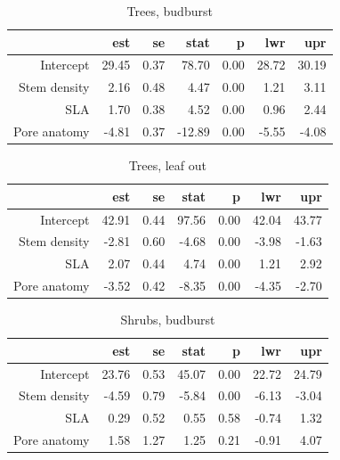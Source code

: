\documentclass[11pt]{article}
\begin{document}
\begin{table}[ht]
\centering
\caption{Trees, budburst} 
\begin{tabular}{rrrrrrr}
  \hline
 & est & se & stat & p & lwr & upr \\ 
  \hline
Intercept & 29.45 & 0.37 & 78.70 & 0.00 & 28.72 & 30.19 \\ 
  Stem density & 2.16 & 0.48 & 4.47 & 0.00 & 1.21 & 3.11 \\ 
  SLA & 1.70 & 0.38 & 4.52 & 0.00 & 0.96 & 2.44 \\ 
  Pore anatomy & -4.81 & 0.37 & -12.89 & 0.00 & -5.55 & -4.08 \\ 
   \hline
\end{tabular}
\end{table}%
\begin{table}[ht]
\centering
\caption{Trees, leaf out} 
\begin{tabular}{rrrrrrr}
  \hline
 & est & se & stat & p & lwr & upr \\ 
  \hline
Intercept & 42.91 & 0.44 & 97.56 & 0.00 & 42.04 & 43.77 \\ 
  Stem density & -2.81 & 0.60 & -4.68 & 0.00 & -3.98 & -1.63 \\ 
  SLA & 2.07 & 0.44 & 4.74 & 0.00 & 1.21 & 2.92 \\ 
  Pore anatomy & -3.52 & 0.42 & -8.35 & 0.00 & -4.35 & -2.70 \\ 
   \hline
\end{tabular}
\end{table}%
\begin{table}[ht]
\centering
\caption{Shrubs, budburst} 
\begin{tabular}{rrrrrrr}
  \hline
 & est & se & stat & p & lwr & upr \\ 
  \hline
Intercept & 23.76 & 0.53 & 45.07 & 0.00 & 22.72 & 24.79 \\ 
  Stem density & -4.59 & 0.79 & -5.84 & 0.00 & -6.13 & -3.04 \\ 
  SLA & 0.29 & 0.52 & 0.55 & 0.58 & -0.74 & 1.32 \\ 
  Pore anatomy & 1.58 & 1.27 & 1.25 & 0.21 & -0.91 & 4.07 \\ 
   \hline
\end{tabular}
\end{table}%
\end{document}
